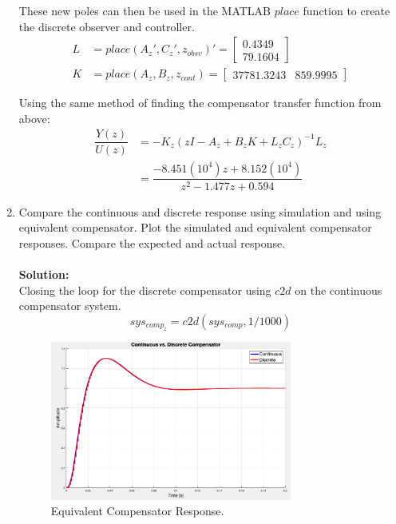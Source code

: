 \documentclass[11pt]{article}
\newcommand{\solution}{\textbf{Solution: \\}}
\begin{document}
\begin{enumerate}[label=\textbf{\arabic*.}]
  These new poles can then be used in the MATLAB $place$ function to create the 
  discrete observer and controller.
  \vspace{24pt}
  \begin{equation}
    \begin{split}
      L &= place(A_z', C_z', z_{obsv})' = 
      \begin{bmatrix}
        0.4349 \\ 79.1604
      \end{bmatrix} \\
      K &= place(A_z, B_z, z_{cont}) =
      \begin{bmatrix}
        37781.3243 & 859.9995
      \end{bmatrix}
    \end{split}
  \end{equation}

  Using the same method of finding the compensator transfer function from above:
  \begin{equation}
    \begin{split}
      \dfrac{Y(z)}{U(z)} &= -K_z(zI - A_z + B_zK + L_zC_z)^{-1}L_z \\
      &= \dfrac{-8.451(10^4)z + 8.152(10^4)}{z^2 - 1.477z + 0.594}
    \end{split}
  \end{equation}

  \vspace{24pt}
  \item Compare the continuous and discrete response using simulation and using 
  equivalent compensator. Plot the simulated and equivalent compensator responses. 
  Compare the expected and actual response. \\ \\ 
  \solution
  Closing the loop for the discrete compensator using $c2d$ on the continuous 
  compensator system.
  \begin{equation}
    sys_{comp_z} = c2d(sys_{comp}, 1/1000)
  \end{equation}

  \begin{figure}[H]
    \centering
    \includegraphics[width=0.75\textwidth]{p6.png}
    \caption{Equivalent Compensator Response.}
  \end{figure}

\end{enumerate}
\end{document}
